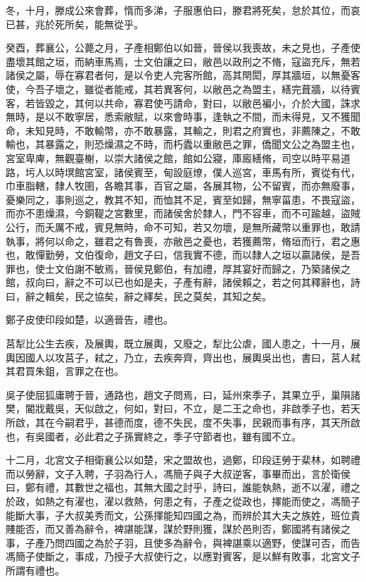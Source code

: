 \begin{pinyinscope}
冬，十月，滕成公來會葬，惰而多涕，子服惠伯曰，滕君將死矣，怠於其位，而哀已甚，兆於死所矣，能無從乎。

癸酉，葬襄公，公薨之月，子產相鄭伯以如晉，晉侯以我喪故，未之見也，子產使盡壞其館之垣，而納車馬焉，士文伯讓之曰，敝邑以政刑之不脩，寇盜充斥，無若諸侯之屬，辱在寡君者何，是以令吏人完客所館，高其閈閎，厚其牆垣，以無憂客使，今吾子壞之，雖從者能戒，其若異客何，以敝邑之為盟主，繕完葺牆，以待賓客，若皆毀之，其何以共命，寡君使丐請命，對曰，以敝邑褊小，介於大國，誅求無時，是以不敢寧居，悉索敝賦，以來會時事，逢執之不間，而未得見，又不獲聞命，未知見時，不敢輸幣，亦不敢暴露，其輸之，則君之府實也，非薦陳之，不敢輸也，其暴露之，則恐燥濕之不時，而朽蠹以重敝邑之罪，僑聞文公之為盟主也，宮室卑庳，無觀臺榭，以崇大諸侯之館，館如公寢，庫廄繕脩，司空以時平易道路，圬人以時塓館宮室，諸侯賓至，甸設庭燎，僕人巡宮，車馬有所，賓從有代，巾車脂轄，隸人牧圉，各瞻其事，百官之屬，各展其物，公不留賓，而亦無廢事，憂樂同之，事則巡之，教其不知，而恤其不足，賓至如歸，無寧菑患，不畏寇盜，而亦不患燥濕，今銅鞮之宮數里，而諸侯舍於隸人，門不容車，而不可踰越，盜賊公行，而夭厲不戒，賓見無時，命不可知，若又勿壞，是無所藏幣以重罪也，敢請執事，將何以命之，雖君之有魯喪，亦敝邑之憂也，若獲薦幣，脩垣而行，君之惠也，敢憚勤勞，文伯復命，趙文子曰，信我實不德，而以隸人之垣以贏諸侯，是吾罪也，使士文伯謝不敏焉，晉侯見鄭伯，有加禮，厚其宴好而歸之，乃築諸侯之館，叔向曰，辭之不可以已也如是夫，子產有辭，諸侯賴之，若之何其釋辭也，詩曰，辭之輯矣，民之協矣，辭之繹矣，民之莫矣，其知之矣。

鄭子皮使印段如楚，以適晉告，禮也。

莒犁比公生去疾，及展輿，既立展輿，又廢之，犁比公虐，國人患之，十一月，展輿因國人以攻莒子，弒之，乃立，去疾奔齊，齊出也，展輿吳出也，書曰，莒人弒其君買朱鉏，言罪之在也。

吳子使屈狐庸聘于晉，通路也，趙文子問焉，曰，延州來季子，其果立乎，巢隕諸樊，閽戕戴吳，天似啟之，何如，對曰，不立，是二王之命也，非啟季子也，若天所啟，其在今嗣君乎，甚德而度，德不失民，度不失事，民親而事有序，其天所啟也，有吳國者，必此君之子孫實終之，季子守節者也，雖有國不立。

十二月，北宮文子相衛襄公以如楚，宋之盟故也，過鄭，印段迋勞于棐林，如聘禮而以勞辭，文子入聘，子羽為行人，馮簡子與子大叔逆客，事畢而出，言於衛侯曰，鄭有禮，其數世之福也，其無大國之討乎，詩曰，誰能執熱，逝不以濯，禮之於政，如熱之有濯也，濯以救熱，何患之有，子產之從政也，擇能而使之，馮簡子能斷大事，子大叔美秀而文，公孫揮能知四國之為，而辨於其大夫之族姓，班位貴賤能否，而又善為辭令，裨諶能謀，謀於野則獲，謀於邑則否，鄭國將有諸侯之事，子產乃問四國之為於子羽，且使多為辭令，與裨諶乘以適野，使謀可否，而告馮簡子使斷之，事成，乃授子大叔使行之，以應對賓客，是以鮮有敗事，北宮文子所謂有禮也。


\end{pinyinscope}
